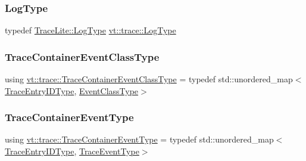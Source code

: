 \mbox{\label{namespacevt_1_1trace_a6e7b7f2c6cb0a14d5b01dde877174a71}} 
\subsubsection{\texorpdfstring{Log\+Type}{LogType}}
{\footnotesize\ttfamily typedef \hyperlink{structvt_1_1trace_1_1_trace_lite_aeb73e523d31829d3163c877b145afa2a}{Trace\+Lite\+::\+Log\+Type} \hyperlink{namespacevt_1_1trace_a6e7b7f2c6cb0a14d5b01dde877174a71}{vt\+::trace\+::\+Log\+Type}}

\mbox{\label{namespacevt_1_1trace_a352c8799ee88afa3f1b7008952ed8485}} 
\subsubsection{\texorpdfstring{Trace\+Container\+Event\+Class\+Type}{TraceContainerEventClassType}}
{\footnotesize\ttfamily using \hyperlink{namespacevt_1_1trace_a352c8799ee88afa3f1b7008952ed8485}{vt\+::trace\+::\+Trace\+Container\+Event\+Class\+Type} = typedef std\+::unordered\+\_\+map$<$\hyperlink{namespacevt_1_1trace_a3c14050715ba9eceaeff51fb3de64f2f}{Trace\+Entry\+I\+D\+Type}, \hyperlink{namespacevt_1_1trace_afc5456ac95b0d3e9bb63a21597f5660c}{Event\+Class\+Type}$>$}

\mbox{\label{namespacevt_1_1trace_a80118aaa48fed940af3899800bba2303}} 
\subsubsection{\texorpdfstring{Trace\+Container\+Event\+Type}{TraceContainerEventType}}
{\footnotesize\ttfamily using \hyperlink{namespacevt_1_1trace_a80118aaa48fed940af3899800bba2303}{vt\+::trace\+::\+Trace\+Container\+Event\+Type} = typedef std\+::unordered\+\_\+map$<$\hyperlink{namespacevt_1_1trace_a3c14050715ba9eceaeff51fb3de64f2f}{Trace\+Entry\+I\+D\+Type}, \hyperlink{namespacevt_1_1trace_a79b7fa947245c08d04a3ea67fbff2c30}{Trace\+Event\+Type}$>$}

